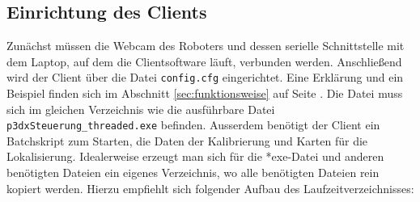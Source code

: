 
\subsection{Einrichtung des Clients}%
\label{sec:einrichtung-client}
Zunächst müssen die Webcam des Roboters und dessen serielle
Schnittstelle  mit dem Laptop, auf dem die Clientsoftware läuft,
verbunden  werden. Anschließend wird der Client über  die Datei \verb|config.cfg| eingerichtet. Eine
Erklärung und ein Beispiel finden sich im Abschnitt
\ref{sec:funktionsweise} auf Seite \pageref{aufbau_config}. Die Datei
muss sich im gleichen Verzeichnis wie die ausführbare Datei
\verb|p3dxSteuerung_threaded.exe| befinden. Ausserdem benötigt der
Client ein Batchskript zum Starten, die
Daten der Kalibrierung und Karten für die Lokalisierung. Idealerweise
erzeugt man sich für die *exe-Datei und anderen benötigten Dateien ein
eigenes Verzeichnis, wo alle benötigten Dateien rein kopiert werden.  Hierzu
empfiehlt sich folgender Aufbau des Laufzeitverzeichnisses: 

